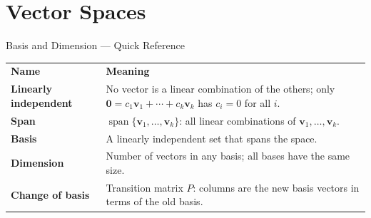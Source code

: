 

\section{Vector Spaces}

\begin{toolkitbox}{Basis and Dimension --- Quick Reference}
\begin{tabular}{@{}p{}p{}@{}}
\textbf{Name} & \textbf{Meaning} \\
\textbf{Linearly independent} & No vector is a linear combination of the others; only $\mathbf{0} = c_1\mathbf{v}_1 + \cdots + c_k\mathbf{v}_k$ has $c_i = 0$ for all $i$. \\[4pt]
\textbf{Span}                 & $\operatorname{span}\{\mathbf{v}_1,\ldots,\mathbf{v}_k\}$: all linear combinations of $\mathbf{v}_1,\ldots,\mathbf{v}_k$. \\[4pt]
\textbf{Basis}                & A linearly independent set that spans the space. \\[4pt]
\textbf{Dimension}            & Number of vectors in any basis; all bases have the same size. \\[4pt]
\textbf{Change of basis}      & Transition matrix $P$: columns are the new basis vectors in terms of the old basis. \\
\end{tabular}
\end{toolkitbox}








